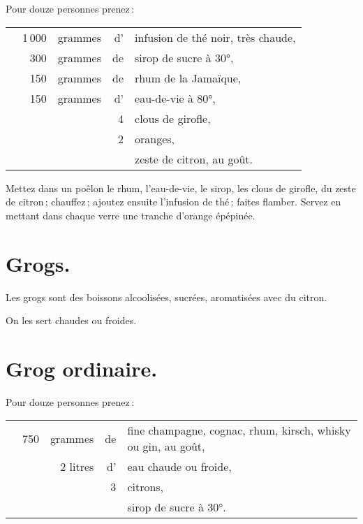 Pour douze personnes prenez :

\footnotesize
\begin{longtable}{rrrrp{16em}}
  & 1 000 & grammes & d' & infusion de thé noir, très chaude,                                             \\
  &   300 & grammes & de & sirop de sucre à 30°,                                                          \\
  &   150 & grammes & de & rhum de la Jamaïque,                                                           \\
  &   150 & grammes & d' & eau-de-vie à 80°,                                                              \\
  &       &         &  4 & clous de girofle,                                                              \\
  &       &         &  2 & oranges,                                                                       \\
  &       &         &    & zeste de citron, au goût.                                                      \\
\end{longtable}
\normalsize

Mettez dans un poêlon le rhum, l'eau-de-vie, le sirop, les clous de girofle, du
zeste de citron ; chauffez ; ajoutez ensuite l'infusion de thé ; faites
flamber. Servez en mettant dans chaque verre une tranche d'orange épépinée.

\section*{\centering Grogs.}
{}

Les grogs sont des boissons alcoolisées, sucrées, aromatisées avec du citron.

On les sert chaudes ou froides.

\section*{\centering Grog ordinaire.}
{}

Pour douze personnes prenez :

\footnotesize
\begin{longtable}{rrrrp{16em}}
  & 750 & grammes & de & fine champagne, cognac, rhum, kirsch, whisky ou gin, au goût,                    \\
  & \multicolumn{2}{r}{2 litres} & d' & eau chaude ou froide,                                             \\
  &     &         &  3 & citrons,                                                                         \\
  &     &         &    & sirop de sucre à 30°.                                                            \\
\end{longtable}
\normalsize

